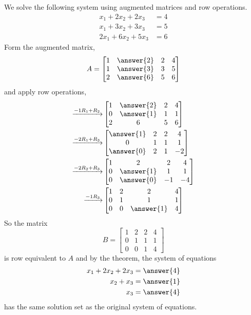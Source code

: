 \documentclass{ximera}
\begin{document}
\begin{example}
  We solve the following system using augmented matrices and row operations.
  \begin{align*}
    x_1+2x_2+2x_3&=4\\
    x_1+3x_2+3x_3&=5\\
    2x_1+6x_2+5x_3&=6
  \end{align*}
  Form the augmented matrix,
  \begin{align*}
    A=\begin{bmatrix}
      1&\answer{2}&2&4\\
      1&\answer{3}&3&5\\
      2&\answer{6}&5&6
    \end{bmatrix}
  \end{align*}
  and apply row operations,
  \begin{align*}
    \xrightarrow{\rowopadd{-1}{1}{2}}
    &
      \begin{bmatrix}
        1&\answer{2}&2&4\\
        0&\answer{1}&1&1\\
        2&6&5&6
      \end{bmatrix} \\
    \xrightarrow{\rowopadd{-2}{1}{3}} 
     &
      \begin{bmatrix}
        \answer{1}&2&2&4\\
        0&1&1&1\\
        \answer{0}&2&1&-2
      \end{bmatrix}\\
    \xrightarrow{\rowopadd{-2}{2}{3}}
    &
      \begin{bmatrix}
        1&2&2&4\\
        0&\answer{1}&1&1\\
        0&\answer{0}&-1&-4
      \end{bmatrix} \\
    \xrightarrow{\rowopmult{-1}{3}}
     &
       \begin{bmatrix}
         1&2&2&4\\
         0&1& 1&1\\
         0&0&\answer{1}&4
       \end{bmatrix}
  \end{align*}
  So the matrix
  \[
    B=\begin{bmatrix}
      1&2&2&4\\
      0&1& 1&1\\
      0&0&1&4
    \end{bmatrix}
  \]
  is row equivalent to $A$
  and by the theorem, the system of equations
  \begin{align*}
    x_1+2x_2+2x_3&=\answer{4}\\
    x_2+ x_3&=\answer{1}\\
    x_3&=\answer{4}
  \end{align*}
  has the same solution set as the original system of equations.
\end{example}
\end{document}
